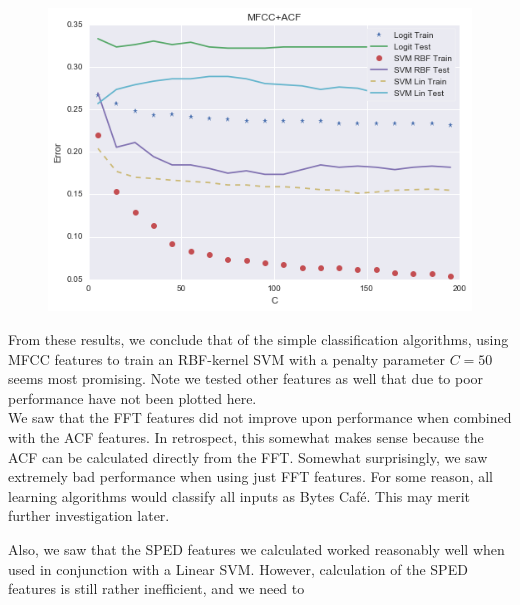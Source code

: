 \documentclass[journal]{IEEEtran}
\begin{document}
\begin{figure}[H]
\centering
\includegraphics[width=0.45\linewidth]{MFCC_ACF_Err}
\end{figure}
From these results, we conclude that of the simple classification algorithms, using MFCC features to train an RBF-kernel SVM with a penalty parameter $C=50$ seems most promising. Note we tested other features as well that due to poor performance have not been plotted here.\\

We saw that the FFT features did not improve upon performance when combined with the ACF features. In retrospect, this somewhat makes sense because the ACF can be calculated directly from the FFT. Somewhat surprisingly, we saw extremely bad performance when using just FFT features. For some reason, all learning algorithms would classify all inputs as Bytes Caf\'e. This may merit further investigation later.

Also, we saw that the SPED features we calculated worked reasonably well when used in conjunction with a Linear SVM. However, calculation of the SPED features is still rather inefficient, and we need to 


%
%
%


\raggedbottom
\end{document}
